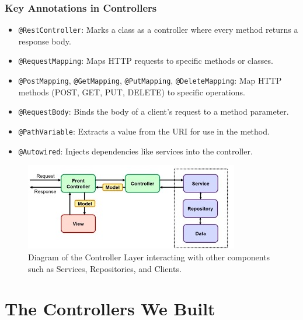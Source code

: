 \documentclass[a4paper,12pt]{article}
\begin{document}
\subsubsection{Key Annotations in Controllers}
\begin{itemize}
    \item \texttt{@RestController}: Marks a class as a controller where every method returns a response body.
    \item \texttt{@RequestMapping}: Maps HTTP requests to specific methods or classes.
    \item \texttt{@PostMapping}, \texttt{@GetMapping}, \texttt{@PutMapping}, \texttt{@DeleteMapping}: Map HTTP methods (POST, GET, PUT, DELETE) to specific operations.
    \item \texttt{@RequestBody}: Binds the body of a client’s request to a method parameter.
    \item \texttt{@PathVariable}: Extracts a value from the URI for use in the method.
    \item \texttt{@Autowired}: Injects dependencies like services into the controller.
\end{itemize}
\noindent\begin{figure}[h!]
    \centering
    \includegraphics[width=\textwidth]{images/controller_layer01.jpg}
    \caption{Diagram of the Controller Layer interacting with other components such as Services, Repositories, and Clients.}
    \label{fig:controller_layer_diagram}
\end{figure}
\section{The Controllers We Built}
\end{document}

